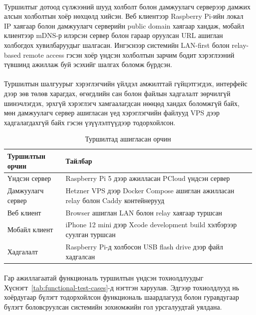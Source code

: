 \paragraph{}
Туршилтыг дотоод сүлжээний шууд холболт болон дамжуулагч серверээр дамжих алсын холболтын хоёр нөхцөлд хийсэн. Веб клиентээр Raspberry Pi-ийн локал IP хаягаар болон дамжуулагч серверийн public domain хаягаар хандаж, мобайл клиентээр mDNS-р илэрсэн сервер болон гараар оруулсан URL ашиглан холбогдох хувилбаруудыг шалгасан. Ингэснээр системийн LAN-first болон relay-based remote access гэсэн хоёр үндсэн холболтын зарчим бодит хэрэглээний түвшинд ажиллаж буй эсэхийг шалгах боломж бүрдсэн.

\paragraph{}
Туршилтын шалгуурыг хэрэглэгчийн үйлдэл амжилттай гүйцэтгэгдэх, интерфейс дээр зөв төлөв харагдах, өгөгдлийн сан болон файлын хадгалалт зөрчилгүй шинэчлэгдэх, эрхгүй хэрэглэгч хамгаалагдсан нөөцөд хандах боломжгүй байх, мөн дамжуулагч сервер ашигласан үед хэрэглэгчийн файлууд VPS дээр хадгалагдахгүй байх гэсэн үзүүлэлтүүдээр тодорхойлсон.

\begin{table}[H]
    \centering
    \begin{tabular}{|p{}|p{}|}
        \hline
        \textbf{Туршилтын орчин} & \textbf{Тайлбар} \\ \hline
        Үндсэн сервер & Raspberry Pi 5 дээр ажилласан PCloud үндсэн сервер \\ \hline
        Дамжуулагч сервер & Hetzner VPS дээр Docker Compose ашиглан ажилласан relay болон Caddy контейнерууд \\ \hline
        Веб клиент & Browser ашиглан LAN болон relay хаягаар туршсан \\ \hline
        Мобайл клиент & iPhone 12 mini дээр Xcode development build хэлбэрээр суулган туршсан \\ \hline
        Хадгалалт & Raspberry Pi-д холбосон USB flash drive дээр файл хадгалсан \\ \hline
    \end{tabular}
    \caption{Туршилтад ашигласан орчин}
    \label{tab:test-environment}
\end{table}

\paragraph{}
Гар ажиллагаатай функциональ туршилтын үндсэн тохиолдлуудыг Хүснэгт~\ref{tab:functional-test-cases}-д нэгтгэн харуулав. Эдгээр тохиолдлууд нь хоёрдугаар бүлэгт тодорхойлсон функциональ шаардлагууд болон гуравдугаар бүлэгт боловсруулсан системийн зохиомжийн гол урсгалуудтай уялдана.

